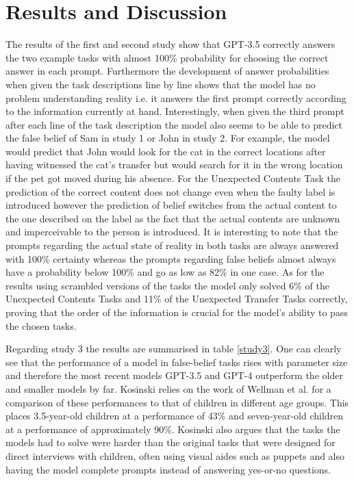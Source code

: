 \section{Results and Discussion}
The results of the first and second study show that GPT-3.5 correctly answers the two example tasks with almost 100\% probability for choosing the correct answer in each prompt. Furthermore the development of answer probabilities when given the task descriptions line by line shows that the model has no problem understanding reality i.e. it answers the first prompt correctly according to the information currently at hand. Interestingly, when given the third prompt after each line of the task description the model also seems to be able to predict the false belief of Sam in study 1 or John in study 2. For example, the model would predict that John would look for the cat in the correct locations after having witnessed the cat's transfer but would search for it in the wrong location if the pet got moved during his absence. For the Unexpected Contents Task the prediction of the correct content does not change even when the faulty label is introduced however the prediction of belief switches from the actual content to the one described on the label as the fact that the actual contents are unknown and imperceivable to the person is introduced. It is interesting to note that the prompts regarding the actual state of reality in both tasks are always answered with 100\% certainty whereas the prompts regarding false beliefs almost always have a probability below 100\% and go as low as 82\% in one case. As for the results using scrambled versions of the tasks the model only solved 6\% of the Unexpected Contents Tasks and 11\% of the Unexpected Transfer Tasks correctly, proving that the order of the information is crucial for the model's ability to pass the chosen tasks.

Regarding study 3 the results are summarised in table \ref{study3}. One can clearly see that the performance of a model in false-belief tasks rises with parameter size and therefore the most recent models GPT-3.5 and GPT-4 outperform the older and smaller models by far. Kosinski relies on the work of Wellman et al. \cite{tom_children_2001} for a comparison of these performances to that of children in different age groups. This places 3.5-year-old children at a performance of 43\% and seven-year-old children at a performance of approximately 90\%. Kosinski also argues that the tasks the models had to solve were harder than the original tasks that were designed for direct interviews with children, often using visual aides such as puppets and also having the model complete prompts instead of answering yes-or-no questions.\cite{kosinski}

